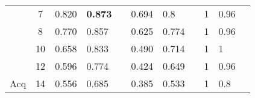 \begin{table}[]
\begin{tabular}{|c|c|l|l|l|l|l|l|l|l|l|}
                       & 7                     & \cellcolor[HTML]{EFEFEF}0.820          & \cellcolor[HTML]{EFEFEF}\textbf{0.873} & \cellcolor[HTML]{EFEFEF}      & 0.694    & 0.8      &          & \cellcolor[HTML]{EFEFEF}1     & \cellcolor[HTML]{EFEFEF}0.96  & \cellcolor[HTML]{EFEFEF}      \\ \cline{2-11} 
                       & 8                     & \cellcolor[HTML]{EFEFEF}0.770          & \cellcolor[HTML]{EFEFEF}0.857          & \cellcolor[HTML]{EFEFEF}      & 0.625    & 0.774    &          & \cellcolor[HTML]{EFEFEF}1     & \cellcolor[HTML]{EFEFEF}0.96  & \cellcolor[HTML]{EFEFEF}      \\ \cline{2-11} 
                       & 10                    & \cellcolor[HTML]{EFEFEF}0.658          & \cellcolor[HTML]{EFEFEF}0.833          & \cellcolor[HTML]{EFEFEF}      & 0.490    & 0.714    &          & \cellcolor[HTML]{EFEFEF}1     & \cellcolor[HTML]{EFEFEF}1     & \cellcolor[HTML]{EFEFEF}      \\ \cline{2-11} 
                       & 12                    & \cellcolor[HTML]{EFEFEF}0.596          & \cellcolor[HTML]{EFEFEF}0.774          & \cellcolor[HTML]{EFEFEF}      & 0.424    & 0.649    &          & \cellcolor[HTML]{EFEFEF}1     & \cellcolor[HTML]{EFEFEF}0.96  & \cellcolor[HTML]{EFEFEF}      \\ \cline{2-11} 
\multirow{-9}{*}{Acq}  & 14                    & \cellcolor[HTML]{EFEFEF}0.556          & \cellcolor[HTML]{EFEFEF}0.685          & \cellcolor[HTML]{EFEFEF}      & 0.385    & 0.533    &          & \cellcolor[HTML]{EFEFEF}1     & \cellcolor[HTML]{EFEFEF}0.8   & \cellcolor[HTML]{EFEFEF}      \\ \hline
\end{tabular}
\end{table}
